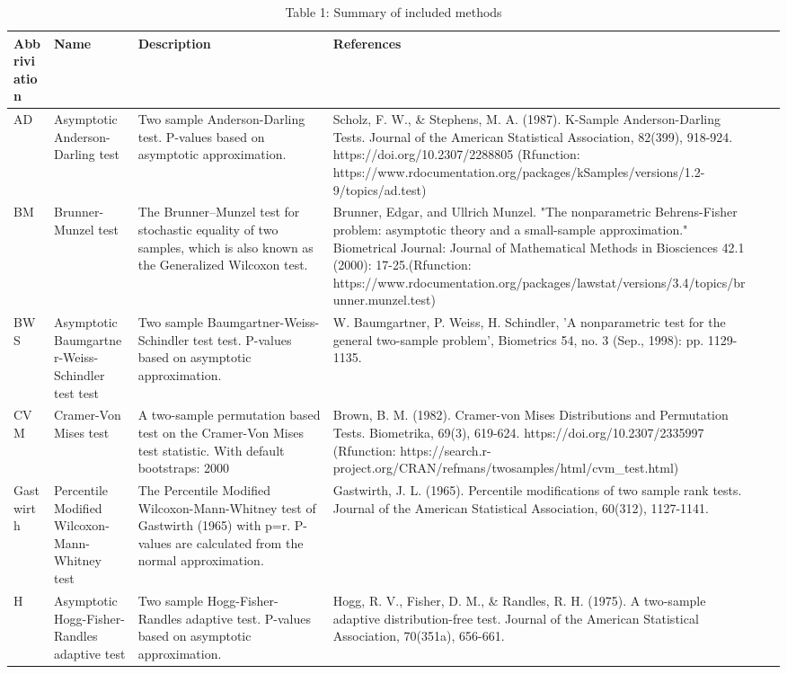\documentclass[
]{article}
\begin{document}
\begin{landscape}\begin{table}[H]

\caption{\label{tab:unnamed-chunk-1}Table 1: Summary of included methods}
\centering
\begin{tabular}[t]{>{}l>{}l>{}l>{}l>{}NA}
\toprule
Abbriviation & Name & Description & References\\
\midrule
AD & Asymptotic Anderson-Darling test & Two sample Anderson-Darling test. P-values based on asymptotic approximation. & Scholz, F. W., \& Stephens, M. A. (1987). K-Sample Anderson-Darling Tests. Journal of the American Statistical Association, 82(399), 918-924. https://doi.org/10.2307/2288805 (Rfunction: https://www.rdocumentation.org/packages/kSamples/versions/1.2-9/topics/ad.test)\\
BM & Brunner-Munzel test & The Brunner--Munzel test for stochastic equality of two samples, which is also known as the Generalized Wilcoxon test. & Brunner, Edgar, and Ullrich Munzel. "The nonparametric Behrens-Fisher problem: asymptotic theory and a small-sample approximation." Biometrical Journal: Journal of Mathematical Methods in Biosciences 42.1 (2000): 17-25.(Rfunction: https://www.rdocumentation.org/packages/lawstat/versions/3.4/topics/brunner.munzel.test)\\
BWS & Asymptotic Baumgartner-Weiss-Schindler test test & Two sample Baumgartner-Weiss-Schindler test test. P-values based on asymptotic approximation. & W. Baumgartner, P. Weiss, H. Schindler, ’A nonparametric test for the general two-sample problem’, Biometrics 54, no. 3 (Sep., 1998): pp. 1129-1135.\\
CVM & Cramer-Von Mises test & A two-sample permutation based test on the Cramer-Von Mises test statistic. With default bootstraps: 2000 & Brown, B. M. (1982). Cramer-von Mises Distributions and Permutation Tests.  Biometrika, 69(3), 619-624. https://doi.org/10.2307/2335997 (Rfunction: https://search.r-project.org/CRAN/refmans/twosamples/html/cvm\_test.html)\\
Gastwirth & Percentile Modified Wilcoxon-Mann-Whitney test & The Percentile Modified Wilcoxon-Mann-Whitney test of Gastwirth (1965) with p=r. P-values are calculated from the normal approximation. & Gastwirth, J. L. (1965). Percentile modifications of two sample rank tests. Journal of the American Statistical Association, 60(312), 1127-1141.\\
\addlinespace
H & Asymptotic Hogg-Fisher-Randles adaptive test & Two sample Hogg-Fisher-Randles adaptive test. P-values based on asymptotic approximation. & Hogg, R. V., Fisher, D. M., \& Randles, R. H. (1975). A two-sample adaptive distribution-free test. Journal of the American Statistical Association, 70(351a), 656-661.\\

\end{tabular}
\end{table}
\end{landscape}
\end{document}
